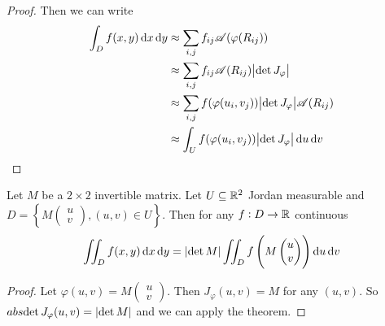 \documentclass[12pt]{extarticle}
\begin{document}
\begin{proof}
    Then we can write
    \begin{align}
        \int_D f(x, y) \dd{x} \dd{y} & \approx \sum_{i,j} f_{ij} \mathscr A (\varphi(R_{ij}))                         \\
                                     & \approx \sum_{i,j} f_{ij} \mathscr A(R_{ij}) \abs{\det J_\varphi}              \\
                                     & \approx \sum_{i,j} f(\varphi(u_i, v_j)) \abs{\det J_\varphi}\mathscr A(R_{ij}) \\
                                     & \approx \int_U f(\varphi(u_i, v_j)) \abs{\det J_\varphi} \dd{u} \dd{v}
    \end{align}
\end{proof}

\begin{corollary}
    Let $M$ be a $2\times 2$ invertible matrix.
    Let $U \subseteq \mathbb{R}^2$ Jordan measurable and $D = \left\{ M \begin{pmatrix} u \\ v\end{pmatrix}, (u, v) \in U \right\}$.
    Then for any $f: D \to \mathbb{R}$ continuous
    \begin{equation}
        \iint_D f(x, y) \dd{x}\dd{y} = \abs{\det M} \iint_D f\left(M\begin{pmatrix} u \\ v\end{pmatrix}\right) \dd{u} \dd{v}
    \end{equation}
\end{corollary}
\begin{proof}
    Let $\varphi(u, v) = M\begin{pmatrix} u \\ v\end{pmatrix}$. Then $J_\varphi(u, v) = M$ for any $(u, v)$.
    So $abs{\det J_\varphi (u, v)} = \abs{\det M}$ and we can apply the theorem.
\end{proof}
\end{document}
